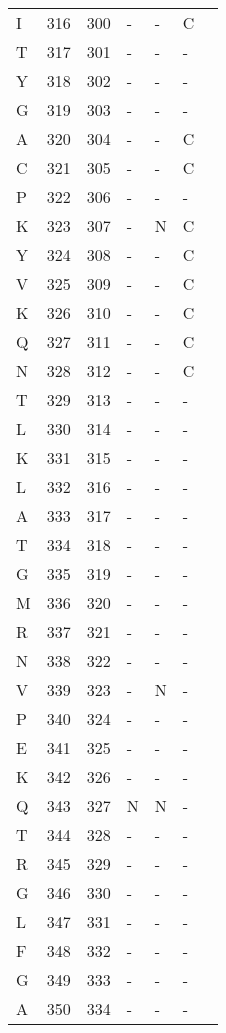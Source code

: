 \documentclass[10pt]{article}
\begin{document}
\begin{longtable}{lllllll}
  I & 316 & 300 & - & - & C &  \\ 
  T & 317 & 301 & - & - & - &  \\ 
  Y & 318 & 302 & - & - & - &  \\ 
  G & 319 & 303 & - & - & - &  \\ 
  A & 320 & 304 & - & - & C &  \\ 
  C & 321 & 305 & - & - & C &  \\ 
  P & 322 & 306 & - & - & - &  \\ 
  K & 323 & 307 & - & N & C &  \\ 
  Y & 324 & 308 & - & - & C &  \\ 
  V & 325 & 309 & - & - & C &  \\ 
  K & 326 & 310 & - & - & C &  \\ 
  Q & 327 & 311 & - & - & C &  \\ 
  N & 328 & 312 & - & - & C &  \\ 
  T & 329 & 313 & - & - & - &  \\ 
  L & 330 & 314 & - & - & - &  \\ 
  K & 331 & 315 & - & - & - &  \\ 
  L & 332 & 316 & - & - & - &  \\ 
  A & 333 & 317 & - & - & - &  \\ 
  T & 334 & 318 & - & - & - &  \\ 
  G & 335 & 319 & - & - & - &  \\ 
  M & 336 & 320 & - & - & - &  \\ 
  R & 337 & 321 & - & - & - &  \\ 
  N & 338 & 322 & - & - & - &  \\ 
  V & 339 & 323 & - & N & - &  \\ 
  P & 340 & 324 & - & - & - &  \\ 
  E & 341 & 325 & - & - & - &  \\ 
  K & 342 & 326 & - & - & - &  \\ 
  Q & 343 & 327 & N & N & - &  \\ 
  T & 344 & 328 & - & - & - &  \\ 
  R & 345 & 329 & - & - & - &  \\ 
  G & 346 & 330 & - & - & - &  \\ 
  L & 347 & 331 & - & - & - &  \\ 
  F & 348 & 332 & - & - & - &  \\ 
  G & 349 & 333 & - & - & - &  \\ 
  A & 350 & 334 & - & - & - &  \\ 

\end{longtable}
\end{document}
